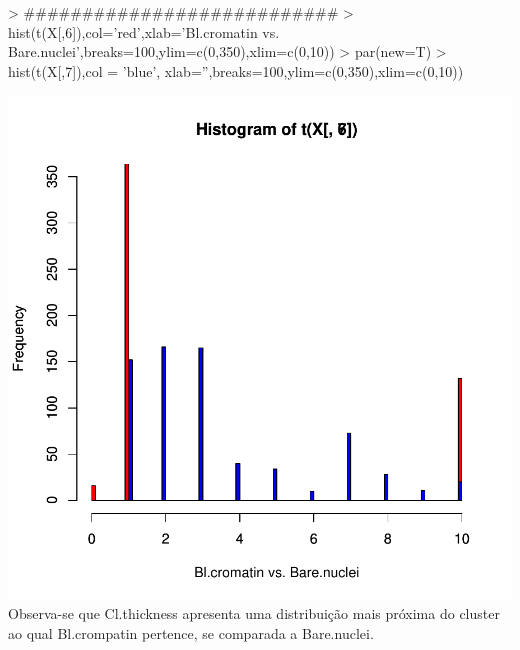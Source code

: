 \documentclass{article}
\begin{document}
\begin{Schunk}
\begin{Sinput}
> ###########################
> hist(t(X[,6]),col='red',xlab='Bl.cromatin vs. Bare.nuclei',breaks=100,ylim=c(0,350),xlim=c(0,10))
> par(new=T)
> hist(t(X[,7]),col = 'blue', xlab='',breaks=100,ylim=c(0,350),xlim=c(0,10))
\end{Sinput}
\end{Schunk}
\includegraphics{selecao-014}
Observa-se que Cl.thickness apresenta uma distribuição mais próxima do cluster ao qual Bl.crompatin pertence, se comparada a Bare.nuclei.
\end{document}
